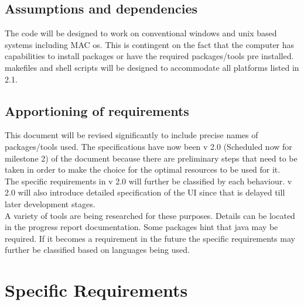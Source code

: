 \documentclass[12pt]{article}
\begin{document}
	\subsection{Assumptions and dependencies}
	The code will be designed to work on conventional windows and unix based systems including MAC os. This is contingent on the fact that the computer has capabilities to install packages or have the required packages/tools pre installed. \\
	makefiles and shell scripts will be designed to accommodate all platforms listed in 2.1.
	\subsection{Apportioning of requirements}
	This document will be revised significantly to include precise names of packages/tools used. The specifications have now been v 2.0 (Scheduled now for milestone 2) of the document because there are preliminary steps that need to be taken in order to make the choice for the optimal resources to be used for it.\\ 
	The specific requirements in v 2.0 will further be classified by each behaviour. v 2.0 will also introduce detailed specification of the UI since that is delayed till later development stages. \\
	A variety of tools are being researched for these purposes. Details can be located in the progress report documentation. Some packages hint that java may be required. If it becomes a requirement in the future the specific requirements may further be classified based on languages being used. 
	\section{Specific Requirements} \label{reqs}
	
	
\end{document}

